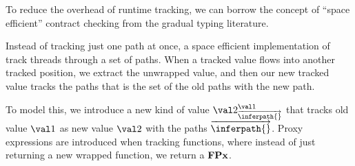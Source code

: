 
To reduce the overhead of runtime tracking, we can borrow
the concept of ``space efficient'' contract checking from
the gradual typing literature.

Instead of tracking just one path at once, a space efficient
implementation of track threads through a set of paths.
When a tracked value flows into another tracked position,
we extract the unwrapped value, and then our new tracked value
tracks the paths that is the set of the old paths with the new path.

To model this, we introduce a new kind of value $\ProxyV{\val1{}}{\val2{}}{\overrightarrow{\inferpath{}}}$
that tracks old value $\val1{}$ as new value $\val2{}$ with the paths $\overrightarrow{\inferpath{}}$.
Proxy expressions are introduced when tracking functions, where instead of just returning
a new wrapped function, we return a $\textbf{FPx}{}$.

